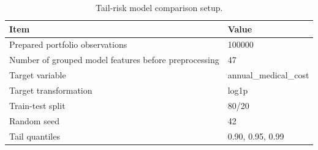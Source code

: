 \begin{table}
\caption{Tail-risk model comparison setup.}
\label{tab:08-tail-risk-setup}
\begin{tabular}{ll}
\toprule
Item & Value \\
\midrule
Prepared portfolio observations & 100000 \\
Number of grouped model features before preprocessing & 47 \\
Target variable & annual_medical_cost \\
Target transformation & log1p \\
Train-test split & 80/20 \\
Random seed & 42 \\
Tail quantiles & 0.90, 0.95, 0.99 \\
\bottomrule
\end{tabular}
\end{table}
